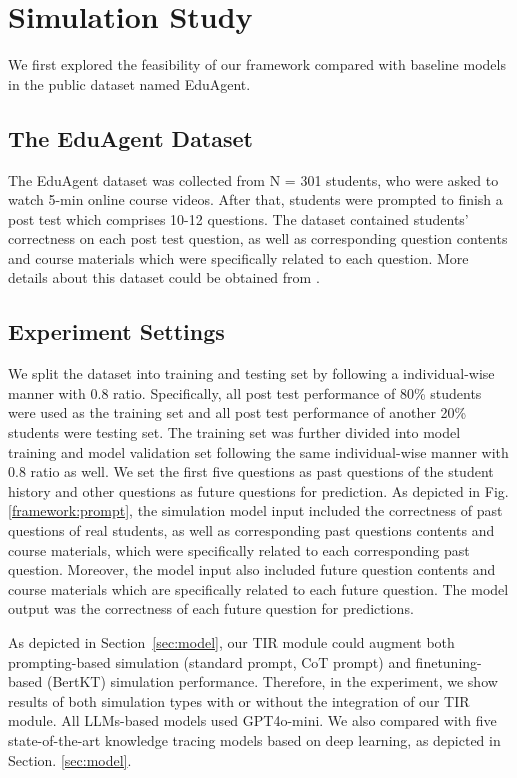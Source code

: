 

\section{Simulation Study}
\label{sec: eduagent results}



We first explored the feasibility of our framework compared with baseline models in the public dataset named EduAgent\cite{xu2024eduagent}. 

\subsection{The EduAgent Dataset}
The EduAgent dataset was collected from N = 301 students, who were asked to watch 5-min online course videos. After that, students were prompted to finish a post test which comprises 10-12 questions. The dataset contained students' correctness on each post test question, as well as corresponding question contents and course materials which were specifically related to each question. More details about this dataset could be obtained from \cite{xu2024eduagent}. 


\subsection{Experiment Settings}
We split the dataset into training and testing set by following a individual-wise manner with 0.8 ratio. Specifically, all post test performance of 80\% students were used as the training set and all post test performance of another 20\% students were testing set. The training set was further divided into model training and model validation set following the same individual-wise manner with 0.8 ratio as well. 
We set the first five questions as past questions of the student history and other questions as future questions for prediction.
As depicted in Fig. \ref{framework:prompt}, the simulation model input included the correctness of past questions of real students, as well as corresponding past questions contents and course materials, which were specifically related to each corresponding past question. Moreover, the model input also included future question contents and course materials which are specifically related to each future question. The model output was the correctness of each future question for predictions. 

As depicted in Section~\ref{sec:model}, our TIR module could augment both prompting-based simulation (standard prompt, CoT prompt) and finetuning-based (BertKT) simulation performance. Therefore, in the experiment, we show results of both simulation types with or without the integration of our TIR module. All LLMs-based models used GPT4o-mini. We also compared with five state-of-the-art knowledge tracing models based on deep learning, as depicted in Section. \ref{sec:model}.



